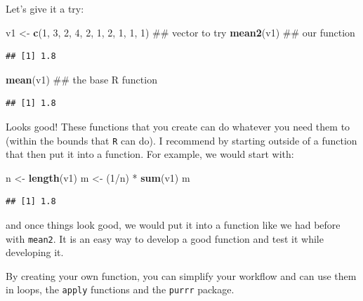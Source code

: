\documentclass[]{tufte-book}
\newenvironment{Shaded}{}{}
\newcommand{\KeywordTok}[1]{\textcolor[rgb]{0.00,0.44,0.13}{\textbf{#1}}}
\newcommand{\DecValTok}[1]{\textcolor[rgb]{0.25,0.63,0.44}{#1}}
\newcommand{\StringTok}[1]{\textcolor[rgb]{0.25,0.44,0.63}{#1}}
\newcommand{\OperatorTok}[1]{\textcolor[rgb]{0.40,0.40,0.40}{#1}}
\newcommand{\NormalTok}[1]{#1}
\theoremstyle{definition}
\theoremstyle{definition}
\theoremstyle{remark}
\begin{document}
Let's give it a try:

\begin{Shaded}
\begin{Highlighting}[]
\NormalTok{v1 <-}\StringTok{ }\KeywordTok{c}\NormalTok{(}\DecValTok{1}\NormalTok{, }\DecValTok{3}\NormalTok{, }\DecValTok{2}\NormalTok{, }\DecValTok{4}\NormalTok{, }\DecValTok{2}\NormalTok{, }\DecValTok{1}\NormalTok{, }\DecValTok{2}\NormalTok{, }\DecValTok{1}\NormalTok{, }\DecValTok{1}\NormalTok{, }\DecValTok{1}\NormalTok{)  ## vector to try}
\KeywordTok{mean2}\NormalTok{(v1)  ## our function}
\end{Highlighting}
\end{Shaded}

\begin{verbatim}
## [1] 1.8
\end{verbatim}

\begin{Shaded}
\begin{Highlighting}[]
\KeywordTok{mean}\NormalTok{(v1)  ## the base R function}
\end{Highlighting}
\end{Shaded}

\begin{verbatim}
## [1] 1.8
\end{verbatim}

Looks good! These functions that you create can do whatever you need
them to (within the bounds that \texttt{R} can do). I recommend by
starting outside of a function that then put it into a function. For
example, we would start with:

\begin{Shaded}
\begin{Highlighting}[]
\NormalTok{n <-}\StringTok{ }\KeywordTok{length}\NormalTok{(v1)}
\NormalTok{m <-}\StringTok{ }\NormalTok{(}\DecValTok{1}\OperatorTok{/}\NormalTok{n) }\OperatorTok{*}\StringTok{ }\KeywordTok{sum}\NormalTok{(v1)}
\NormalTok{m}
\end{Highlighting}
\end{Shaded}

\begin{verbatim}
## [1] 1.8
\end{verbatim}

and once things look good, we would put it into a function like we had
before with \texttt{mean2}. It is an easy way to develop a good function
and test it while developing it.

By creating your own function, you can simplify your workflow and can
use them in loops, the \texttt{apply} functions and the \texttt{purrr}
package.
\end{document}
